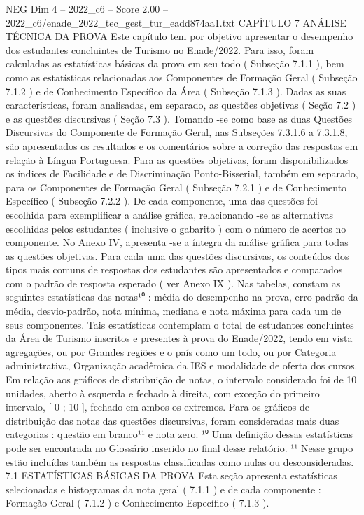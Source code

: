\begin{textsample}{NEG Dim 4 – 2022\_c6 – Score 2.00 – 2022\_c6/enade\_2022\_tec\_gest\_tur\_eadd874aa1.txt}  \label{ex:f4_neg_273}
CAPÍTULO 7 ANÁLISE TÉCNICA DA PROVA Este capítulo tem por objetivo apresentar o desempenho dos estudantes concluintes de Turismo no Enade/2022.
Para isso, foram calculadas as estatísticas básicas da prova em seu todo ( Subseção 7.1.1 ), bem como as estatísticas relacionadas aos Componentes de Formação Geral ( Subseção 7.1.2 ) e de Conhecimento Específico da Área ( Subseção 7.1.3 ).
Dadas as suas características, foram analisadas, em separado, as questões objetivas ( Seção 7.2 ) e as questões discursivas ( Seção 7.3 ).
Tomando -se como base as duas Questões Discursivas do Componente de Formação Geral, nas Subseções 7.3.1.6 a 7.3.1.8, são apresentados os resultados e os comentários sobre a correção das respostas em relação à Língua Portuguesa.
Para as questões objetivas, foram disponibilizados os índices de Facilidade e de Discriminação Ponto-Bisserial, também em separado, para os Componentes de Formação Geral ( Subseção 7.2.1 ) e de Conhecimento Específico ( Subseção 7.2.2 ).
De cada componente, uma das questões foi escolhida para exemplificar a análise gráfica, relacionando -se as alternativas escolhidas pelos estudantes ( inclusive o gabarito ) com o número de acertos no componente.
No Anexo IV, apresenta -se a íntegra da análise gráfica para todas as questões objetivas.
Para cada uma das questões discursivas, os conteúdos dos tipos mais comuns de respostas dos estudantes são apresentados e comparados com o padrão de resposta esperado ( ver Anexo IX ).
Nas tabelas, constam as seguintes estatísticas das notas¹⁰ : média do desempenho na prova, erro padrão da média, desvio-padrão, nota mínima, mediana e nota máxima para cada um de seus componentes.
Tais estatísticas contemplam o total de estudantes concluintes da Área de Turismo inscritos e presentes à prova do Enade/2022, tendo em vista agregações, ou por Grandes regiões e o país como um todo, ou por Categoria administrativa, Organização acadêmica da IES e modalidade de oferta dos cursos.
Em relação aos gráficos de distribuição de notas, o intervalo considerado foi de 10 unidades, aberto à esquerda e fechado à direita, com exceção do primeiro intervalo, [ 0 ; 10 ], fechado em ambos os extremos.
Para os gráficos de distribuição das notas das questões discursivas, foram consideradas mais duas categorias : questão em branco¹¹ e nota zero. ¹⁰ Uma definição dessas estatísticas pode ser encontrada no Glossário inserido no final desse relatório. ¹¹ Nesse grupo estão incluídas também as respostas classificadas como nulas ou desconsideradas. 7.1 ESTATÍSTICAS BÁSICAS DA PROVA Esta seção apresenta estatísticas selecionadas e histogramas da nota geral ( 7.1.1 ) e de cada componente : Formação Geral ( 7.1.2 ) e Conhecimento Específico ( 7.1.3 ).

\end{textsample}
